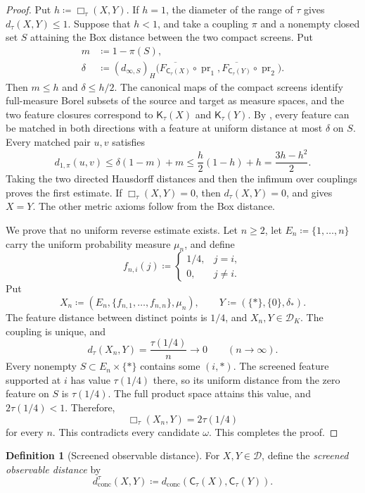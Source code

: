\documentclass[11pt]{amsart}
\theoremstyle{plain}
\theoremstyle{definition}
\newtheorem{definition}[theorem]{Definition}
\theoremstyle{remark}
\newcommand{\D}{\mathcal D}
\newcommand{\DK}{\mathcal D_K}
\newcommand{\Kc}{\mathsf K}
\newcommand{\dconc}{d_{\mathrm{conc}}}
\newcommand{\dtau}{d_{\tau}}
\DeclareMathOperator{\pr}{pr}
\begin{document}
\begin{proof}
Put $h\coloneqq\Box_\tau(X,Y)$. If $h=1$, the diameter of the range of $\tau$ gives $\dtau(X,Y)\leq1$. Suppose that $h<1$, and take a coupling $\pi$ and a nonempty closed set $S$ attaining the Box distance between the two compact screens. Put
\[
\begin{aligned}
m&\coloneqq1-\pi(S),\\
\delta&\coloneqq(d_{\infty,S})_H
\bigl(\overline{F_{\mathsf C_\tau(X)}}\circ\pr_1,
\overline{F_{\mathsf C_\tau(Y)}}\circ\pr_2\bigr).
\end{aligned}
\]
Then $m\leq h$ and $\delta\leq h/2$. The canonical maps of the compact screens identify full-measure Borel subsets of the source and target as measure spaces, and the two feature closures correspond to $\Kc_\tau(X)$ and $\Kc_\tau(Y)$. By , every feature can be matched in both directions with a feature at uniform distance at most $\delta$ on $S$. Every matched pair $u,v$ satisfies
\[
d_{1,\pi}(u,v)
\leq\delta(1-m)+m
\leq\frac h2(1-h)+h
=\frac{3h-h^2}{2}.
\]
Taking the two directed Hausdorff distances and then the infimum over couplings proves the first estimate. If $\Box_\tau(X,Y)=0$, then $\dtau(X,Y)=0$, and  gives $X=Y$. The other metric axioms follow from the Box distance.

We prove that no uniform reverse estimate exists. Let $n\geq2$, let $E_n\coloneqq\{1,\ldots,n\}$ carry the uniform probability measure $\mu_n$, and define
\[
f_{n,i}(j)\coloneqq
\begin{cases}
1/4,&j=i,\\
0,&j\neq i.
\end{cases}
\]
Put
\[
X_n\coloneqq(E_n,\{f_{n,1},\ldots,f_{n,n}\},\mu_n),\qquad
Y\coloneqq(\{*\},\{0\},\delta_*).
\]
The feature distance between distinct points is $1/4$, and $X_n,Y\in\DK$. The coupling is unique, and
\[
\dtau(X_n,Y)=\frac{\tau(1/4)}{n}\longrightarrow0
\qquad(n\to\infty).
\]
Every nonempty $S\subset E_n\times\{*\}$ contains some $(i,*)$. The screened feature supported at $i$ has value $\tau(1/4)$ there, so its uniform distance from the zero feature on $S$ is $\tau(1/4)$. The full product space attains this value, and $2\tau(1/4)<1$. Therefore,
\[
\Box_\tau(X_n,Y)=2\tau(1/4)
\]
for every $n$. This contradicts every candidate $\omega$. This completes the proof.
\end{proof}

\begin{definition}[Screened observable distance]
\label{def:screened-observable-distance}
For $X,Y\in\D$, define the \emph{screened observable distance} by
\[
\dconc^\tau(X,Y)\coloneqq
\dconc(\mathsf C_\tau(X),\mathsf C_\tau(Y)).
\]
\end{definition}
\end{document}
